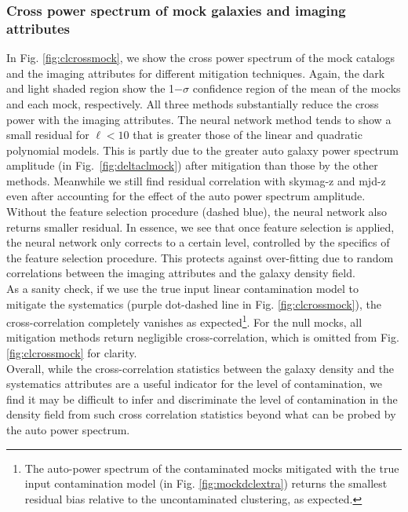 \documentclass[fleqn, usenatbib]{mnras}
\begin{document}
\subsubsection{Cross power spectrum of mock galaxies and imaging attributes}
In Fig. \ref{fig:clcrossmock}, we show the cross power spectrum of the mock catalogs and the imaging attributes for different mitigation techniques. Again, the dark and light shaded region show the 1$-\sigma$ confidence region of the mean of the mocks and each mock, respectively. All three methods substantially reduce the cross power with the imaging attributes. The neural network method tends to show a small residual for $\ell <10$ that is greater those of the linear and quadratic polynomial models. This is partly due to the greater auto galaxy power spectrum amplitude (in Fig.~\ref{fig:deltaclmock}) after mitigation than those by the other methods. Meanwhile we still find residual correlation with skymag-z and mjd-z even after accounting for the effect of the auto power spectrum amplitude. Without the feature selection procedure (dashed blue), the neural network also returns smaller residual. In essence, we see that once feature selection is applied, the neural network only corrects to a certain level, controlled by the specifics of the feature selection procedure. This protects against over-fitting due to random correlations between the imaging attributes and the galaxy density field.\\

As a sanity check, if we use the true input linear contamination model to mitigate the systematics (purple dot-dashed line in Fig. \ref{fig:clcrossmock}), the cross-correlation completely vanishes as expected\footnote{The auto-power spectrum of the contaminated mocks mitigated with the true input contamination model (in Fig. \ref{fig:mockdclextra}) returns the smallest residual bias relative to the uncontaminated clustering, as expected.}. For the null mocks, all mitigation methods return negligible cross-correlation, which is omitted from Fig. \ref{fig:clcrossmock} for clarity.\\

Overall, while the cross-correlation statistics between the galaxy density and the systematics attributes are a useful indicator for the level of contamination, we find it may be difficult to infer and discriminate the level of contamination in the density field from such cross correlation statistics beyond what can be probed by the auto power spectrum.
\end{document}
